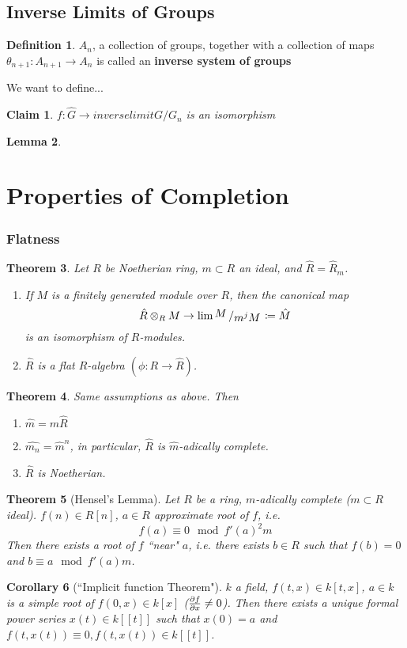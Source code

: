 \documentclass[12pt]{article}
\newcommand{\bigslant}[2]{{\raisebox{.2em}{$#1$}\left/\raisebox{-.2em}{$#2$}\right.}}
\newtheorem{theorem}{Theorem}
\newtheorem{corollary}[theorem]{Corollary}
\newtheorem{lemma}[theorem]{Lemma}
\newtheorem*{claim}{Claim}
\theoremstyle{definition}
\newtheorem{definition}[theorem]{Definition}
\begin{document}
\subsection*{Inverse Limits of Groups}
\begin{definition}
$A_n$, a collection of groups, together with a collection of maps $\theta_{n+1}: A_{n+1}\rightarrow A_n$ is called an \textbf{inverse system of groups}
\end{definition}
We want to define...
\begin{claim}
$f: \hat{G} \rightarrow inverselimit G/G_n$ is an isomorphism
\end{claim}

\begin{lemma}

\end{lemma}
\date{22.11.2018}
\section*{Properties of Completion}
\subsubsection*{Flatness}
\begin{theorem}
Let $R$ be Noetherian ring, $m\subset R$ an ideal, and $\hat{R} = \hat{R}_m$. 
\begin{enumerate}
    \item If $M$ is a finitely generated module over $R$, then the canonical map
    \[
    \hat{R} \otimes_R M \rightarrow \lim \bigslant{M}{m^jM} \coloneqq \hat{M}
    \]
    is an isomorphism of $R$-modules. 
    \item $\hat{R}$ is a flat $R$-algebra $(\phi: R \rightarrow \hat{R})$. 
\end{enumerate}
\end{theorem}
\begin{theorem}
Same assumptions as above. Then 
\begin{enumerate}
    \item $\hat{m} = m\hat{R}$
    \item $\hat{m_n} = \hat{m}^n$, in particular, $\hat{R} $ is $\hat{m}$-adically complete.
    \item $\hat{R}$ is Noetherian.
\end{enumerate}
\end{theorem}
\begin{theorem}[Hensel's Lemma]
Let $R$ be a ring, $m$-adically complete ($m\subset R$ ideal). $f(n)\in R[n]$, $a\in R$ approximate root of $f$, i.e. 
\[
f(a) \equiv  0 \mod f'(a)^2m
\]
Then there exists a root of $f$ ``near" $a$, i.e. there exists $b\in R$ such that $f(b)  = 0$ and $b \equiv a \mod f'(a)m$.
\end{theorem}
\begin{corollary}[``Implicit function Theorem"]
$k$ a field, $f(t , x) \in k[t, x]$, $a\in k$ is a simple root of $f(0,x) \in k[x]$ ($\pdv{f}{x} \neq 0$). Then there exists a unique formal power series $x(t) \in k[[t]] $ such that $x(0) = a $ and $f(t,x(t)) \equiv 0, f(t,x(t)) \in k[[t]]$. 
\end{corollary}
\date{27.11.2018}
\end{document}
